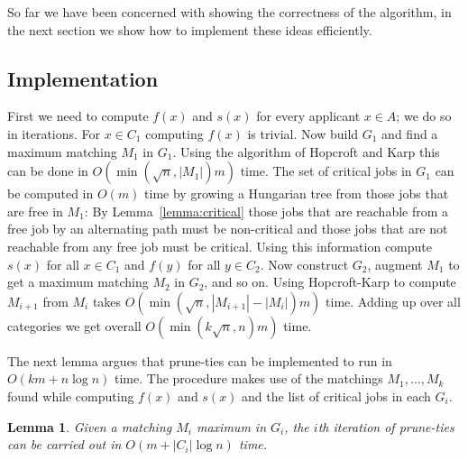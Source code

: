\documentclass[11pt]{article}
\newcommand{\first}{f}
\newcommand{\second}{s}
\newtheorem{lemma}{Lemma}
\begin{document}
So far we have been concerned with showing the correctness of the algorithm, in the next section we show how to implement these ideas efficiently.

\subsection{Implementation}

First we need to compute $\first(x)$ and $\second(x)$ for every applicant $x \in A$; we do so in iterations. For $x \in C_1$ computing $\first(x)$ is trivial. Now build $G_1$ and find a maximum matching $M_1$ in $G_1$. Using the algorithm of Hopcroft and Karp \cite{HK73} this can be done in $O(\min(\sqrt{n},|M_1|)m)$ time. The set of critical jobs in $G_1$ can be computed in $O(m)$ time by growing a Hungarian tree \cite{CombOpt-book} from those jobs that are free in $M_1$: By Lemma~\ref{lemma:critical} those jobs that are reachable from a free job by an alternating path must be non-critical and those jobs that are not reachable from any free job must be critical. Using this information compute $\second(x)$ for all $x \in C_1$ and $\first(y)$ for all $y \in C_2$. Now construct $G_2$, augment $M_1$ to get a maximum matching $M_2$ in $G_2$, and so on. Using Hopcroft-Karp to compute $M_{i+1}$ from $M_i$ takes $O( \min( \sqrt{n} , |M_{i+1}| - |M_{i}| ) m )$ time. Adding up over all categories we get overall $O( \min( k \sqrt{n}, n) m)$ time.

The next lemma argues that {\sc prune-ties} can be implemented to run in $O(k m + n \log n)$ time. The procedure makes use of the matchings $M_1, \ldots, M_k$ found while computing $f(x)$ and $s(x)$ and the list of critical jobs in each $G_i$.

\begin{lemma} Given a matching $M_i$ maximum in $G_i$, the $i$th iteration of {\sc prune-ties} can be carried out in $O(m + |C_i| \log n)$ time.
\end{lemma}
\end{document}
